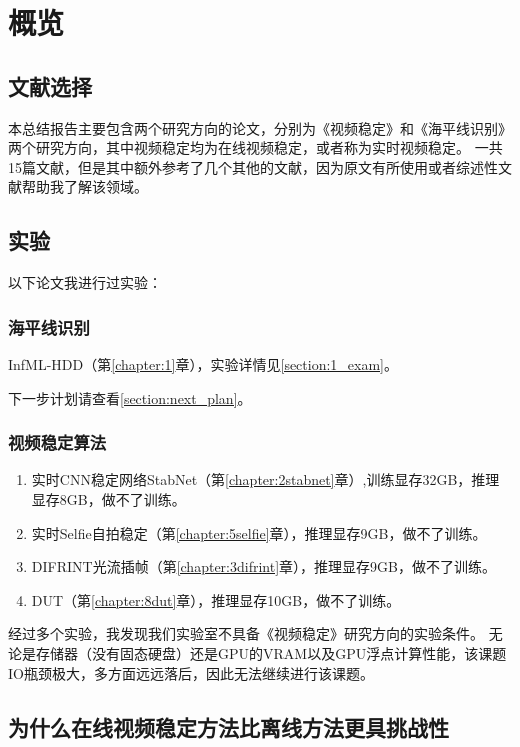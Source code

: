 \newpage
\chapter{概览}

\section{文献选择}

本总结报告主要包含两个研究方向的论文，分别为《视频稳定》和《海平线识别》两个研究方向，其中视频稳定均为在线视频稳定，或者称为实时视频稳定。
一共15篇文献，但是其中额外参考了几个其他的文献，因为原文有所使用或者综述性文献帮助我了解该领域。

\section{实验}

以下论文我进行过实验：

\subsection{海平线识别}

InfML-HDD（第\ref{chapter:1}章），实验详情见\ref{section:1_exam}。

下一步计划请查看\ref{section:next_plan}。

\subsection{视频稳定算法}

\begin{enumerate}
	\item 实时CNN稳定网络StabNet（第\ref{chapter:2stabnet}章）,训练显存32GB，推理显存8GB，做不了训练。
	\item 实时Selfie自拍稳定（第\ref{chapter:5selfie}章），推理显存9GB，做不了训练。
	\item DIFRINT光流插帧（第\ref{chapter:3difrint}章），推理显存9GB，做不了训练。
	\item DUT（第\ref{chapter:8dut}章），推理显存10GB，做不了训练。
\end{enumerate}

经过多个实验，我发现我们实验室不具备《视频稳定》研究方向的实验条件。
无论是存储器（没有固态硬盘）还是GPU的VRAM以及GPU浮点计算性能，该课题IO瓶颈极大，多方面远远落后，因此无法继续进行该课题。

\section{为什么在线视频稳定方法比离线方法更具挑战性}

